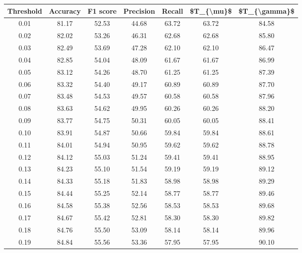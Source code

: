 \begin{tabular}{|c|c|c|c|c|c|c|}
\hline
 Threshold &  Accuracy &  F1 score &  Precision &  Recall &  \$T\_\{\textbackslash mu\}\$ &  \$T\_\{\textbackslash gamma\}\$ \\
\hline
      0.01 &     81.17 &     52.53 &      44.68 &   63.72 &      63.72 &         84.58 \\
      0.02 &     82.02 &     53.26 &      46.31 &   62.68 &      62.68 &         85.80 \\
      0.03 &     82.49 &     53.69 &      47.28 &   62.10 &      62.10 &         86.47 \\
      0.04 &     82.85 &     54.04 &      48.09 &   61.67 &      61.67 &         86.99 \\
      0.05 &     83.12 &     54.26 &      48.70 &   61.25 &      61.25 &         87.39 \\
      0.06 &     83.32 &     54.40 &      49.17 &   60.89 &      60.89 &         87.70 \\
      0.07 &     83.48 &     54.53 &      49.57 &   60.58 &      60.58 &         87.96 \\
      0.08 &     83.63 &     54.62 &      49.95 &   60.26 &      60.26 &         88.20 \\
      0.09 &     83.77 &     54.75 &      50.31 &   60.05 &      60.05 &         88.41 \\
      0.10 &     83.91 &     54.87 &      50.66 &   59.84 &      59.84 &         88.61 \\
      0.11 &     84.01 &     54.94 &      50.95 &   59.62 &      59.62 &         88.78 \\
      0.12 &     84.12 &     55.03 &      51.24 &   59.41 &      59.41 &         88.95 \\
      0.13 &     84.23 &     55.10 &      51.54 &   59.19 &      59.19 &         89.12 \\
      0.14 &     84.33 &     55.18 &      51.83 &   58.98 &      58.98 &         89.29 \\
      0.15 &     84.44 &     55.25 &      52.14 &   58.77 &      58.77 &         89.46 \\
      0.16 &     84.58 &     55.38 &      52.56 &   58.53 &      58.53 &         89.68 \\
      0.17 &     84.67 &     55.42 &      52.81 &   58.30 &      58.30 &         89.82 \\
      0.18 &     84.76 &     55.50 &      53.09 &   58.14 &      58.14 &         89.96 \\
      0.19 &     84.84 &     55.56 &      53.36 &   57.95 &      57.95 &         90.10 \\

\end{tabular}
